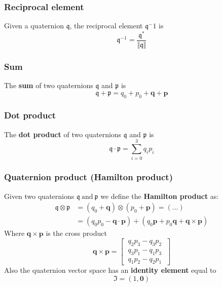 {\color{red} \subsubsection*{Reciprocal element}}
\noindent
Given a quaternion $\mathfrak{q}$, the reciprocal element $\mathfrak{q}^-1$ is
{\Large{
    \begin{equation*}
        \mathfrak{q}^{-1}=\frac{\mathfrak{q}^*}{\Vert \mathfrak{q} \Vert}
    \end{equation*}
}} 

{\color{red} \subsubsection*{Sum}}
\noindent
The \textbf{sum} of two quaternions $\mathfrak{q}$ and  $\mathfrak{p}$ is
{\Large{
    \begin{equation*}
        \mathfrak{q}+\mathfrak{p}=q_0+p_0+\mathbf{q}+\mathbf{p}
    \end{equation*}
}}

{\color{red} \subsubsection*{Dot product}}
\noindent
The \textbf{dot product} of two quaternions $\mathfrak{q}$ and $\mathfrak{p}$ is
{\Large{
    \begin{equation*}
        \mathfrak{q} \cdot \mathfrak{p} = 
        \sum_{i=0}^3 {q_i p_i}
    \end{equation*}
}}
 
{\color{red} \subsubsection*{Quaternion product (Hamilton product)}}
\noindent
Given two quaternions $\mathfrak{q} \ \text{and} \ \mathfrak{p}$ we define the \textbf{Hamilton product} as:
{\Large{
    \begin{align*}
        \mathfrak{q} \otimes \mathfrak{p} &= 
        (q_0+\mathbf{q}) \otimes (p_0+\mathbf{p}) = (...)\\
        &= (q_0p_0-\mathbf{q}\cdot\mathbf{p})+(q_0\mathbf{p}+p_0\mathbf{q}+\mathbf{q}\times\mathbf{p})
    \end{align*}
}}
Where $\mathbf{q}\times\mathbf{p}$ is the cross product
\begin{equation*}
    \mathbf{q}\times\mathbf{p}=
    \begin{bmatrix}
        \ q_2p_3-q_3p_2 \ \\
        \ q_3p_1-q_1p_3 \ \\
        \ q_1p_2-q_2p_1 \
    \end{bmatrix}
\end{equation*}
Also the quaternion vector space has an \textbf{identity element} equal to
{\Large{
    \begin{equation*}
        \mathfrak{I} = (1, \mathbf{0})
    \end{equation*}
}}

